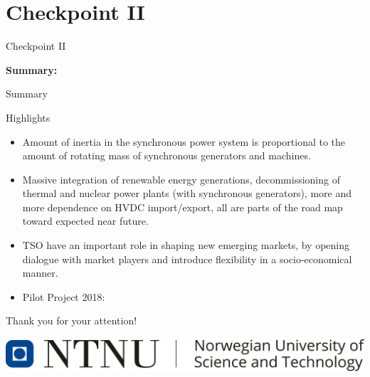 \documentclass{beamer}
\begin{document}
\section{Checkpoint II}
\begin{frame}{Checkpoint II}
\centering \begin{block}{}
\textbf{Summary:}
\end{block} 
\end{frame}

\begin{frame}{Summary}
\begin{block}{Highlights}
{\scriptsize
\begin{itemize}
\item<1-> Amount of inertia in the synchronous power system is proportional to the amount of rotating mass of synchronous generators and machines.
\item<2-> Massive integration of renewable energy generations, decommissioning of thermal and nuclear power plants (with synchronous generators), more and more dependence on HVDC import/export, all are parts of the road map toward expected near future.
\item<3-> TSO have an important role in shaping new emerging markets, by opening dialogue with market players and introduce flexibility in a socio-economical manner.
\item<4-> Pilot Project 2018:
\end{itemize}
}
\end{block}
\end{frame}

\begin{frame}
\centering
Thank you for your attention!\\
		\vskip 0.8cm

\centering
\includegraphics[scale=0.2]{ntnulogo_eng.png}
\end{frame} 
\end{document}
